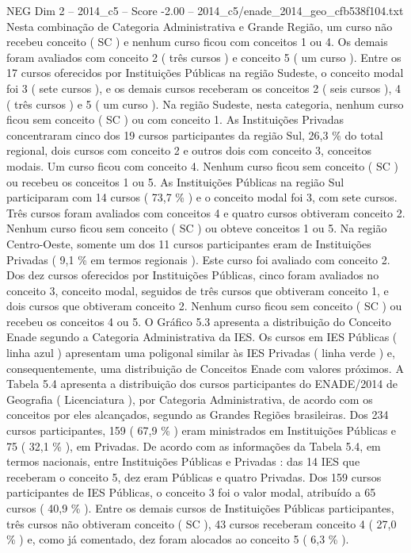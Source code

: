 \begin{textsample}{NEG Dim 2 – 2014\_c5 – Score -2.00 – 2014\_c5/enade\_2014\_geo\_cfb538f104.txt}
Nesta combinação de Categoria Administrativa e Grande Região, um curso não recebeu conceito ( SC ) e nenhum curso ficou com conceitos 1 ou 4.
Os demais foram avaliados com conceito 2 ( três cursos ) e conceito 5 ( um curso ).
Entre os 17 cursos oferecidos por Instituições Públicas na região Sudeste, o conceito modal foi 3 ( sete cursos ), e os demais cursos receberam os conceitos 2 ( seis cursos ), 4 ( três cursos ) e 5 ( um curso ).
Na região Sudeste, nesta categoria, nenhum curso ficou sem conceito ( SC ) ou com conceito 1.
As Instituições Privadas concentraram cinco dos 19 cursos participantes da região Sul, 26,3 \% do total regional, dois cursos com conceito 2 e outros dois com conceito 3, conceitos modais.
Um curso ficou com conceito 4.
Nenhum curso ficou sem conceito ( SC ) ou recebeu os conceitos 1 ou 5.
As Instituições Públicas na região Sul participaram com 14 cursos ( 73,7 \% ) e o conceito modal foi 3, com sete cursos.
Três cursos foram avaliados com conceitos 4 e quatro cursos obtiveram conceito 2.
Nenhum curso ficou sem conceito ( SC ) ou obteve conceitos 1 ou 5.
Na região Centro-Oeste, somente um dos 11 cursos participantes eram de Instituições Privadas ( 9,1 \% em termos regionais ).
Este curso foi avaliado com conceito 2.
Dos dez cursos oferecidos por Instituições Públicas, cinco foram avaliados no conceito 3, conceito modal, seguidos de três cursos que obtiveram conceito 1, e dois cursos que obtiveram conceito 2.
Nenhum curso ficou sem conceito ( SC ) ou recebeu os conceitos 4 ou 5.
O Gráfico 5.3 apresenta a distribuição do Conceito Enade segundo a Categoria Administrativa da IES.
Os cursos em IES Públicas ( linha azul ) apresentam uma poligonal similar às IES Privadas ( linha verde ) e, consequentemente, uma distribuição de Conceitos Enade com valores próximos.
A Tabela 5.4 apresenta a distribuição dos cursos participantes do ENADE/2014 de Geografia ( Licenciatura ), por Categoria Administrativa, de acordo com os conceitos por eles alcançados, segundo as Grandes Regiões brasileiras.
Dos 234 cursos participantes, 159 ( 67,9 \% ) eram ministrados em Instituições Públicas e 75 ( 32,1 \% ), em Privadas.
De acordo com as informações da Tabela 5.4, em termos nacionais, entre Instituições Públicas e Privadas : das 14 IES que receberam o conceito 5, dez eram Públicas e quatro Privadas.
Dos 159 cursos participantes de IES Públicas, o conceito 3 foi o valor modal, atribuído a 65 cursos ( 40,9 \% ).
Entre os demais cursos de Instituições Públicas participantes, três cursos não obtiveram conceito ( SC ), 43 cursos receberam conceito 4 ( 27,0 \% ) e, como já comentado, dez foram alocados ao conceito 5 ( 6,3 \% ).

\end{textsample}
